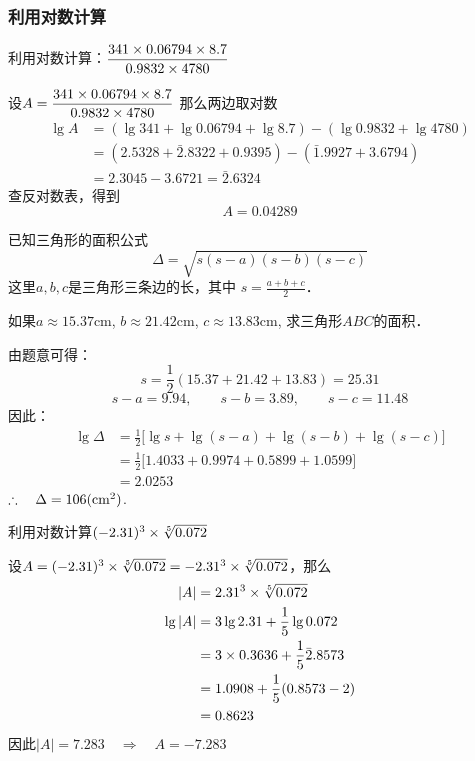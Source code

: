 \subsubsection{利用对数计算}

\begin{example}
    利用对数计算：$\dfrac{341\times 0.06794\times 8.7}{0.9832\times 4780}$
\end{example}

\begin{solution}
设$A=\dfrac{341\times 0.06794\times 8.7}{0.9832\times 4780}$
那么两边取对数
\[\begin{split}
    \lg A&=(\lg 341+\lg0.06794+\lg8.7)-(\lg0.9832+\lg4780)\\
&=(2.5328+\bar{2}.8322+0.9395)-(\bar{1}.9927+3.6794)\\
&=2.3045-3.6721=\bar{2}.6324
\end{split}\]
查反对数表，得到
\[A=0.04289\]    
\end{solution}    


\begin{example}
    已知三角形的面积公式
    \[\Delta=\sqrt{s(s-a)(s-b)(s-c)}\]
    这里$a,b,c$是三角形三条边的长，其中
    $s=\frac{a+b+c}{2}$．

    如果$a\approx 15.37$cm, $b\approx 21.42$cm, $c\approx13.83$cm,
    求三角形$ABC$的面积．
\end{example}

\begin{solution}
由题意可得：
\[s=\frac{1}{2}(15.37+21.42+13.83)=25.31\]
\[s-a=9.94,\qquad s-b=3.89,\qquad s-c=11.48\]
因此：
\[\begin{split}
    \lg \Delta&=\frac{1}{2}\bigl[\lg s+\lg(s-a)+\lg(s-b)+\lg(s-c)\bigr]\\
&=\frac{1}{2}\bigl[1.4033+0.9974+0.5899+1.0599\bigr]\\
&=2.0253
\end{split}\]
$\therefore\quad \Delta=106({\rm cm}^2)$.
\end{solution}    

\begin{example}
    利用对数计算$(-2.31)^3\times\sqrt[5]{0.072}$
\end{example}

\begin{solution}
    设$A=(-2.31)^3\times\sqrt[5]{0.072}=-2.31^3\times\sqrt[5]{0.072}$，那么
\[\begin{split}
    |A|&=2.31^3\times \sqrt[5]{0.072}\\
\lg|A|&=3\lg 2.31+\dfrac{1}{5}\lg 0.072\\
&=3\times 0.3636+\dfrac{1}{5} \bar{2}.8573\\
&=1.0908+\dfrac{1}{5}(0.8573-2)\\
&=0.8623
\end{split}\]
因此$|A|=7.283 \quad \Rightarrow\quad A=-7.283$
\end{solution}    


